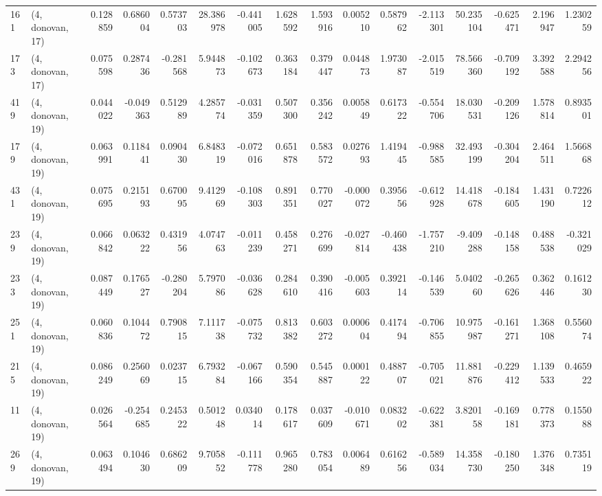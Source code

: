 \begin{tabular}{llrrrrrrrrrrrrrr}
161 &  (4, donovan, 17) &   0.128859 &  0.686004 &  0.573703 &   28.386978 & -0.441005 &   1.628592 &  1.593916 &  0.005210 &  0.587962 & -2.113301 &   50.235104 & -0.625471 &  2.196947 &  1.230259 \\
173 &  (4, donovan, 17) &   0.075598 &  0.287436 & -0.281568 &    5.944873 & -0.102673 &   0.363184 &  0.379447 &  0.044873 &  1.973087 & -2.015519 &   78.566360 & -0.709192 &  3.392588 &  2.294256 \\
419 &  (4, donovan, 19) &   0.044022 & -0.049363 &  0.512989 &    4.285774 & -0.031359 &   0.507300 &  0.356242 &  0.005849 &  0.617322 & -0.554706 &   18.030531 & -0.209126 &  1.578814 &  0.893501 \\
179 &  (4, donovan, 19) &   0.063991 &  0.118441 &  0.090430 &    6.848319 & -0.072016 &   0.651878 &  0.583572 &  0.027693 &  1.419445 & -0.988585 &   32.493199 & -0.304204 &  2.464511 &  1.566868 \\
431 &  (4, donovan, 19) &   0.075695 &  0.215193 &  0.670095 &    9.412969 & -0.108303 &   0.891351 &  0.770027 & -0.000072 &  0.395656 & -0.612928 &   14.418678 & -0.184605 &  1.431190 &  0.722612 \\
239 &  (4, donovan, 19) &   0.066842 &  0.063222 &  0.431956 &    4.074763 & -0.011239 &   0.458271 &  0.276699 & -0.027814 & -0.460438 & -1.757210 &   -9.409288 & -0.148158 &  0.488538 & -0.321029 \\
233 &  (4, donovan, 19) &   0.087449 &  0.176527 & -0.280204 &    5.797086 & -0.036628 &   0.284610 &  0.390416 & -0.005603 &  0.392114 & -0.146539 &    5.040260 & -0.265626 &  0.362446 &  0.161230 \\
251 &  (4, donovan, 19) &   0.060836 &  0.104472 &  0.790815 &    7.111738 & -0.075732 &   0.813382 &  0.603272 &  0.000604 &  0.417494 & -0.706855 &   10.975987 & -0.161271 &  1.368108 &  0.556074 \\
215 &  (4, donovan, 19) &   0.086249 &  0.256069 &  0.023715 &    6.793284 & -0.067166 &   0.590354 &  0.545887 &  0.000122 &  0.488707 & -0.705021 &   11.881876 & -0.229412 &  1.139533 &  0.465922 \\
11  &  (4, donovan, 19) &   0.026564 & -0.254685 &  0.245322 &    0.501248 &  0.034014 &   0.178617 &  0.037609 & -0.010671 &  0.083202 & -0.622381 &    3.820158 & -0.169181 &  0.778373 &  0.155088 \\
269 &  (4, donovan, 19) &   0.063494 &  0.104630 &  0.686209 &    9.705852 & -0.111778 &   0.965280 &  0.783054 &  0.006489 &  0.616256 & -0.589034 &   14.358730 & -0.180250 &  1.376348 &  0.735119 \\

\end{tabular}
